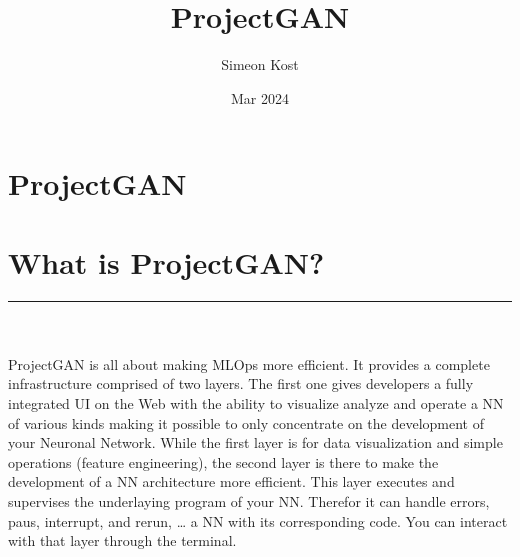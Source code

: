 \documentclass{article}
\title{ProjectGAN}
\author{Simeon Kost}
\date{Mar 2024}
\begin{document}
\maketitle
\section*{\centering\huge ProjectGAN}
\section*{What is ProjectGAN?}
\rule{\paperwidth}{0.4pt}
\\
\\ProjectGAN is all about making MLOps more efficient. 
It provides a complete infrastructure comprised of two layers. 
The first one gives developers a fully integrated UI on the Web with the ability to visualize analyze and operate a NN of various kinds making it possible to only concentrate on the development of your Neuronal Network. 
While the first layer is for data visualization and simple operations (feature engineering), the second layer is there to make the development of a NN architecture more efficient. 
This layer executes and supervises the underlaying program of your NN. 
Therefor it can handle errors, paus, interrupt, and rerun, … a NN with its corresponding code. 
You can interact with that layer through the terminal. 
\end{document}
